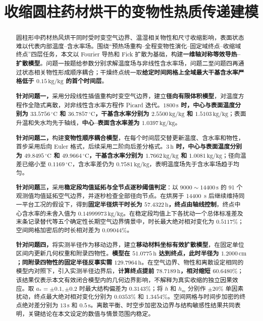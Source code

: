 \documentclass[withoutpreface,bwprint]{cumcmthesis}
\title{收缩圆柱药材烘干的变物性热质传递建模}
\begin{document}
\maketitle

\begin{abstract}
圆柱形中药材热风烘干同时受时变空气边界、温湿相关物性和尺寸收缩影响，表面状态难以代表内部温度--含水率场。围绕“预热场重构--全程变物性演化--固定域终点--收缩域终点”四层任务，本文以 Fourier 导热和 Fick 扩散为基础，构建\textbf{一维轴对称等效导热--扩散模型}。问题一按题给参数分别求解温度场与非线性含水率场，问题二至问题四再通过状态相关物性形成顺序耦合；干燥终点统一取\textbf{给定时间网格上全域最大干基含水率严格低于 \(0.15\,\mathrm{kg/kg}\) 的首个时间层}。

\textbf{针对问题一，}采用分段线性插值重构时变空气边界，建立\textbf{径向有限体积模型}，对温度方程作全隐式离散，对非线性含水率方程作 Picard 迭代。\textbf{\(1800\,\mathrm{s}\) 时，中心与表面温度分别为 \(33.5756\,{}^\circ\mathrm{C}\) 和 \(36.7857\,{}^\circ\mathrm{C}\)，干基含水率分别为 \(2.5500\,\mathrm{kg/kg}\) 和 \(1.5103\,\mathrm{kg/kg}\)}；表面升温和失水均先于轴线，\textbf{中心--表面含水率差为 \(1.0397\,\mathrm{kg/kg}\)}。

\textbf{针对问题二，}构建\textbf{变物性顺序耦合模型}，在每个时间层交替更新温度、含水率和物性，首步采用后向 Euler 格式，后续采用二阶向后差分格式。\textbf{\(3\,\mathrm{h}\) 时，中心与表面温度分别为 \(49.8495\,{}^\circ\mathrm{C}\) 和 \(49.9664\,{}^\circ\mathrm{C}\)，干基含水率分别为 \(1.7662\,\mathrm{kg/kg}\) 和 \(1.0081\,\mathrm{kg/kg}\)}；径向温差已缩小至 \(0.1169\,{}^\circ\mathrm{C}\)，含水率差仍为 \(0.7581\,\mathrm{kg/kg}\)，表明温度场先于含水率场趋于均匀。

\textbf{针对问题三，}采用\textbf{稳定段均值延拓与全节点逐秒阈值判定}：以 \(9000\!\sim\!14400\,\mathrm{s}\) 的 91 个观测值均值延拓空气边界，并逐秒检查全部径向节点。在烘房于 \SI{14400}{s} 后继续维持同一平台工况的假设下，得到\textbf{固定半径烘干时长为 \(57.4322\,\mathrm{h}\)，终点由轴线控制}，终点中心含水率的未舍入值为 \(0.14999973\,\mathrm{kg/kg}\)。在稳定段均值上下各扰动一个总体标准差及末条记录替代等五个确定性长期空气边界情景中，时长最大绝对相对变化为 \(0.5117\%\)；空间网格加密后的时长相对差为 \(0.09044\%\)。

\textbf{针对问题四，}将实测半径作为移动边界，建立\textbf{移动材料坐标有效扩散模型}，在固定单位区间内更新几何权重和附录四物性。\textbf{模型在 \(51.0775\,\mathrm{h}\) 达到终点，此时半径为 \(1.2000\,\mathrm{cm}\)；同附录四物性的固定半径反事实需 \(129.7964\,\mathrm{h}\)}。在空气边界、物性和离散设定相同的模型内对照下，引入实测半径边界后，\textbf{计算终点提前 \(78.7189\,\mathrm{h}\)，相对缩短 \(60.6480\%\)}；该结果仅表示本文有效闭合模型内的几何边界影响，不解释为真实收缩的独立因果效应。取 \(a_*=\pm0.1,\pm0.2\) 时最大结构偏差为 \(0.3143\%\)；将 \(h\) 和 \(h_m\) 分别作 \(\pm20\%\) 单因素扰动，终点最大绝对相对变化分别为 \(0.0353\%\) 和 \(1.3454\%\)。空间网格与时间步加密的终点绝对差分别为 \(13\,\mathrm{s}\) 和 \(0.5\,\mathrm{s}\)。离散平衡、时空步加密及边界与结构敏感性结果共同表明，关键结论在本文设定的数值与情景范围内稳定。

\end{abstract}
\end{document}
